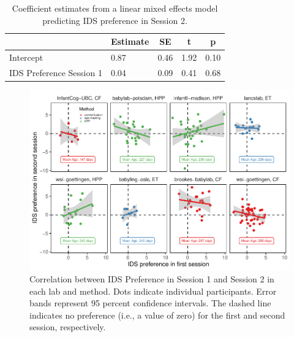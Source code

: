 \documentclass[
  man,floatsintext]{apa6}
\begin{document}
\begin{table}[tbp]

\begin{center}
\begin{threeparttable}

\caption{\label{tab:coef_table2}Coefficient estimates from a linear mixed effects model predicting IDS preference in Session 2.}

\begin{tabular}{lllll}
\toprule
 & \multicolumn{1}{c}{Estimate} & \multicolumn{1}{c}{SE} & \multicolumn{1}{c}{t} & \multicolumn{1}{c}{p}\\
\midrule
Intercept & 0.87 & 0.46 & 1.92 & 0.10\\
IDS Preference Session 1 & 0.04 & 0.09 & 0.41 & 0.68\\
\bottomrule
\end{tabular}

\end{threeparttable}
\end{center}

\end{table}

\begin{figure}

{\centering \includegraphics{Retest_current_draft_files/figure-latex/unnamed-chunk-5-1} 

}

\caption{Correlation between IDS Preference in Session 1 and Session 2 in each lab and method. Dots indicate individual participants. Error bands represent 95 percent confidence intervals. The dashed line indicates no preference (i.e., a value of zero) for the first and second session, respectively.}\label{fig:unnamed-chunk-5}
\end{figure}
\end{document}
